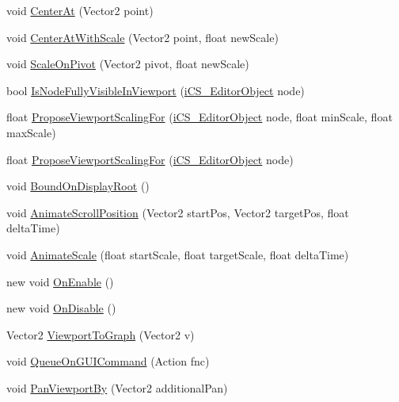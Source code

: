 \begin{DoxyCompactItemize}
\item 
void \hyperlink{classi_c_s___visual_editor_a53758b741d615e775ebc6c6721dc4816}{Center\+At} (Vector2 point)
\item 
void \hyperlink{classi_c_s___visual_editor_ad617a5992ce2095eb7de1e59255cb711}{Center\+At\+With\+Scale} (Vector2 point, float new\+Scale)
\item 
void \hyperlink{classi_c_s___visual_editor_ae2958668e4ace1eb4bb79335d1588ad2}{Scale\+On\+Pivot} (Vector2 pivot, float new\+Scale)
\item 
bool \hyperlink{classi_c_s___visual_editor_ac2b7bac30d34866c3120655af1f020bf}{Is\+Node\+Fully\+Visible\+In\+Viewport} (\hyperlink{classi_c_s___editor_object}{i\+C\+S\+\_\+\+Editor\+Object} node)
\item 
float \hyperlink{classi_c_s___visual_editor_ad615b7c4a52805a87a65214ae4269eed}{Propose\+Viewport\+Scaling\+For} (\hyperlink{classi_c_s___editor_object}{i\+C\+S\+\_\+\+Editor\+Object} node, float min\+Scale, float max\+Scale)
\item 
float \hyperlink{classi_c_s___visual_editor_a6806a2387d305c1f2bc1c0d8cdeb08e8}{Propose\+Viewport\+Scaling\+For} (\hyperlink{classi_c_s___editor_object}{i\+C\+S\+\_\+\+Editor\+Object} node)
\item 
void \hyperlink{classi_c_s___visual_editor_a96d386b275fe1fd0173ce32b6db4aa72}{Bound\+On\+Display\+Root} ()
\item 
void \hyperlink{classi_c_s___visual_editor_af511ea04d685ae3d5095c0c25902d339}{Animate\+Scroll\+Position} (Vector2 start\+Pos, Vector2 target\+Pos, float delta\+Time)
\item 
void \hyperlink{classi_c_s___visual_editor_a78e81c993dbd0eeeb273c15a70c4f775}{Animate\+Scale} (float start\+Scale, float target\+Scale, float delta\+Time)
\item 
new void \hyperlink{classi_c_s___visual_editor_af299832b5aacc86fc0b8ba17261eb71b}{On\+Enable} ()
\item 
new void \hyperlink{classi_c_s___visual_editor_a5e1dbe0a00f1d4bbd943e05cf310b51f}{On\+Disable} ()
\item 
Vector2 \hyperlink{classi_c_s___visual_editor_a4ab7ca5ae494114d707fdbae0dac9974}{Viewport\+To\+Graph} (Vector2 v)
\item 
void \hyperlink{classi_c_s___visual_editor_a59743529db9d57f6fae950a67c9e6a51}{Queue\+On\+G\+U\+I\+Command} (Action fnc)
\item 
void \hyperlink{classi_c_s___visual_editor_a5558839dc41d603bddb594c00935fe04}{Pan\+Viewport\+By} (Vector2 additional\+Pan)
\end{DoxyCompactItemize}
